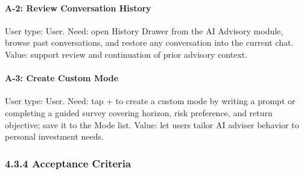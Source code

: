 
\paragraph{A-2: Review Conversation History}

User type: User. Need: open History Drawer from the AI Advisory module, browse past conversations, and restore any conversation into the current chat. Value: support review and continuation of prior advisory context.


\paragraph{A-3: Create Custom Mode}

User type: User. Need: tap + to create a custom mode by writing a prompt or completing a guided survey covering horizon, risk preference, and return objective; save it to the Mode list. Value: let users tailor AI adviser behavior to personal investment needs.


\subsubsection{4.3.4 Acceptance Criteria}

